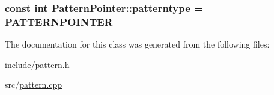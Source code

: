 \subsubsection[{patterntype}]{\setlength{\rightskip}{0pt plus 5cm}const int Pattern\+Pointer\+::patterntype = {\bf P\+A\+T\+T\+E\+R\+N\+P\+O\+I\+N\+T\+E\+R}\hspace{0.3cm}{\ttfamily [static]}}\label{classPatternPointer_a51173670c6a2294d3c0eb4fe38d48a59}


The documentation for this class was generated from the following files\+:\begin{DoxyCompactItemize}
\item 
include/\hyperlink{pattern_8h}{pattern.\+h}\item 
src/\hyperlink{pattern_8cpp}{pattern.\+cpp}\end{DoxyCompactItemize}
